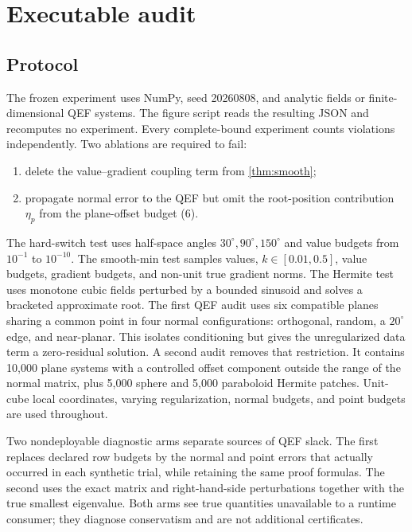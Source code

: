 \documentclass[11pt]{article}
\theoremstyle{definition}
\begin{document}
\section{Executable audit}
\label{sec:experiments}

\subsection{Protocol}

The frozen experiment uses NumPy, seed 20260808, and analytic fields or
finite-dimensional QEF systems.  The figure script reads the resulting JSON
and recomputes no experiment.  Every complete-bound experiment counts
violations independently.  Two ablations are required to fail:

\begin{enumerate}[leftmargin=*]
\item delete the value--gradient coupling term from \cref{thm:smooth};
\item propagate normal error to the QEF but omit the root-position contribution
\(\eta_p\) from the plane-offset budget (6).
\end{enumerate}

The hard-switch test uses half-space angles \(30^\circ,90^\circ,150^\circ\)
and value budgets from \(10^{-1}\) to \(10^{-10}\).  The smooth-min test samples
values, \(k\in[0.01,0.5]\), value budgets, gradient budgets, and non-unit true
gradient norms.  The Hermite test uses monotone cubic fields perturbed by a
bounded sinusoid and solves a bracketed approximate root.  The first QEF audit
uses six compatible planes sharing a common point in four normal
configurations: orthogonal, random, a \(20^\circ\) edge, and near-planar.  This
isolates conditioning but gives the unregularized data term a zero-residual
solution.  A second audit removes that restriction.  It contains 10,000 plane
systems with a controlled offset component outside the range of the normal
matrix, plus 5,000 sphere and 5,000 paraboloid Hermite patches.  Unit-cube
local coordinates, varying regularization, normal budgets, and point budgets
are used throughout.

Two nondeployable diagnostic arms separate sources of QEF slack.  The first
replaces declared row budgets by the normal and point errors that actually
occurred in each synthetic trial, while retaining the same proof formulas.
The second uses the exact matrix and right-hand-side perturbations together
with the true smallest eigenvalue.  Both arms see true quantities unavailable
to a runtime consumer; they diagnose conservatism and are not additional
certificates.
\end{document}
